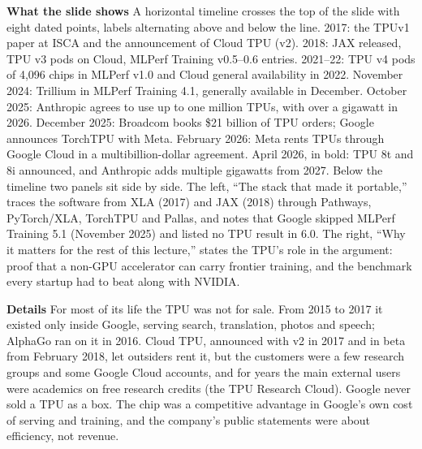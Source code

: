 \documentclass[11pt,letterpaper]{article}
\newcommand{\para}[1]{\medskip\noindent\textbf{#1}\quad}
\begin{document}
\para{What the slide shows} A horizontal timeline crosses the top of the slide with eight dated points, labels alternating above and below the line. 2017: the TPUv1 paper at ISCA and the announcement of Cloud TPU (v2). 2018: JAX released, TPU v3 pods on Cloud, MLPerf Training v0.5--0.6 entries. 2021--22: TPU v4 pods of 4{,}096 chips in MLPerf v1.0 and Cloud general availability in 2022. November 2024: Trillium in MLPerf Training 4.1, generally available in December. October 2025: Anthropic agrees to use up to one million TPUs, with over a gigawatt in 2026. December 2025: Broadcom books \$21 billion of TPU orders; Google announces TorchTPU with Meta. February 2026: Meta rents TPUs through Google Cloud in a multibillion-dollar agreement. April 2026, in bold: TPU 8t and 8i announced, and Anthropic adds multiple gigawatts from 2027. Below the timeline two panels sit side by side. The left, ``The stack that made it portable,'' traces the software from XLA (2017) and JAX (2018) through Pathways, PyTorch/XLA, TorchTPU and Pallas, and notes that Google skipped MLPerf Training 5.1 (November 2025) and listed no TPU result in 6.0. The right, ``Why it matters for the rest of this lecture,'' states the TPU's role in the argument: proof that a non-GPU accelerator can carry frontier training, and the benchmark every startup had to beat along with NVIDIA.

\para{Details} For most of its life the TPU was not for sale. From 2015 to 2017 it existed only inside Google, serving search, translation, photos and speech; AlphaGo ran on it in 2016. Cloud TPU, announced with v2 in 2017 and in beta from February 2018, let outsiders rent it, but the customers were a few research groups and some Google Cloud accounts, and for years the main external users were academics on free research credits (the TPU Research Cloud). Google never sold a TPU as a box. The chip was a competitive advantage in Google's own cost of serving and training, and the company's public statements were about efficiency, not revenue.
\end{document}

